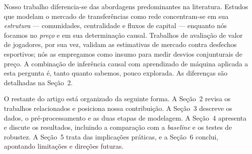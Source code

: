 Nosso trabalho diferencia-se das abordagens predominantes na literatura. Estudos que modelam o
mercado de transferências como rede concentram-se em sua \textit{estrutura} — comunidades, centralidade
e fluxos de capital — enquanto nós focamos no \textit{preço} e em sua determinação causal. Trabalhos
de avaliação de valor de jogadores, por sua vez, validam as estimativas de mercado contra desfechos
esportivos; nós as empregamos como insumo para medir desvios conjunturais de preço. A combinação de
inferência causal com aprendizado de máquina aplicada a esta pergunta é, tanto quanto sabemos, pouco
explorada. As diferenças são detalhadas na Seção~2.

O restante do artigo está organizado da seguinte forma. A Seção~2 revisa os trabalhos relacionados e
posiciona nossa contribuição. A Seção~3 descreve os dados, o pré-processamento e as duas etapas de
modelagem. A Seção~4 apresenta e discute os resultados, incluindo a comparação com a \textit{baseline}
e os testes de robustez. A Seção~5 trata das implicações práticas, e a Seção~6 conclui, apontando
limitações e direções futuras.
